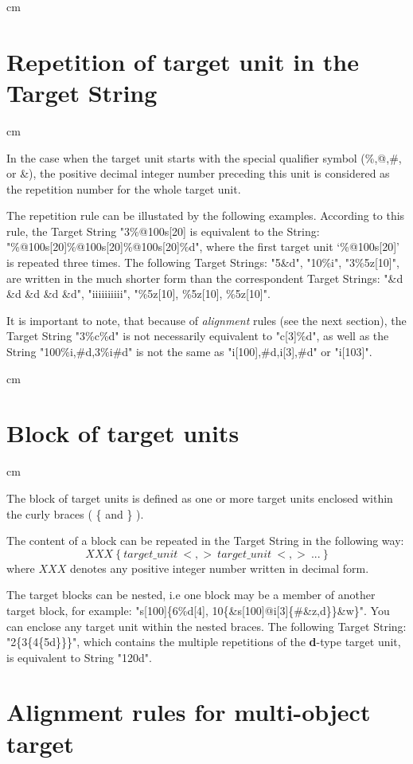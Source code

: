  cm
\section*{Repetition of target unit in the Target String}
 cm

In the case when the target unit starts with the special qualifier
symbol (\%,@,\#, or \&), the positive decimal integer number
preceding this unit is considered as the repetition number
for the whole target unit.

The repetition rule can be illustated by the following examples.
According to this rule, the Target String "3\%@100s[20]%
is equivalent to the String:
"\%@100s[20]\%@100s[20]\%@100s[20]\%d",
where the first target unit `\%@100s[20]' is repeated three times.
The following Target Strings: "5\&d", "10\%i", "3\%5z[10]",
are written in the much shorter form than 
the correspondent Target Strings:
"\&d \&d \&d \&d \&d", "iiiiiiiiii", "\%5z[10], \%5z[10], \%5z[10]".

It is important to note, that because of  {\it alignment} rules
(see the next section), 
the Target String
"3\%c\%d" is not necessarily equivalent to "c[3]\%d",
as well as the String
"100\%i,\#d,3\%i\#d" is not the same as "i[100],\#d,i[3],\#d" or "i[103]".
 
 cm
\section*{Block of target units}
 cm

The block of target units is defined as one or more target units
enclosed within the curly braces ( \{ and \} ). 

The content of a block can be repeated in the Target String
in the following way:
$$XXX\ \{\ target\_unit\ <,>\ target\_unit\ <,>\ ...\ \} $$
where $XXX$ denotes any positive integer number written in decimal form.

The target blocks can be nested, i.e one block may be a member
of another target block, for example:
"s[100]\{6\%d[4], 10\{\&s[100]@i[3]\{\#\&z,d\}\}\&w\}".
You can enclose any target unit within the nested braces.  
The following Target String: "2\{3\{4\{5d\}\}\}", 
which contains the multiple repetitions 
of the {\bf d}-type target unit, is equivalent to String "120d".

\section{Alignment rules for multi-object target}

